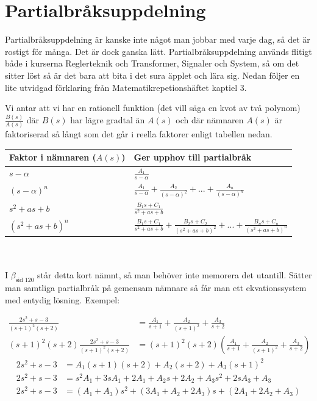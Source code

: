 \documentclass[a4paper]{article}
\newcommand{\mhb}[1]{$\beta_{\text{#1}}$}     %
\begin{document}
\section{Partialbråksuppdelning}
\label{sec:partialbråksuppdelning}
Partialbråksuppdelning är kanske inte något man jobbar med varje dag, så det är rostigt för många. Det är dock ganska lätt. Partialbråksuppdelning används flitigt både i kurserna Reglerteknik och Transformer, Signaler och System, så om det sitter löst så är det bara att bita i det sura äpplet och lära sig. Nedan följer en lite utvidgad förklaring från Matematikrepetionshäftet kaptiel 3.

Vi antar att vi har en rationell funktion (det vill säga en kvot av två polynom) $\frac{B(s)}{A(s)}$ där $B(s)$ har lägre gradtal än $A(s)$ och där nämnaren $A(s)$ är faktoriserad så långt som det går i reella faktorer enligt tabellen nedan.\\

\begin{tabular}{l | l}
  Faktor i nämnaren ($A(s)$) & Ger upphov till partialbråk \\
  \hline
  $s - \alpha$       & $\frac{A_1}{s - \alpha}$ \\
  $(s - \alpha)^n$   & $\frac{A_1}{s - \alpha} + \frac{A_2}{(s - \alpha)^2} + ... + \frac{A_n}{(s - \alpha)^n}$ \\
  $s^2 + as + b$     & $\frac{B_1s + C_1}{s^2 + as + b}$ \\
  $(s^2 + as + b)^n$ & $\frac{B_1s + C_1}{s^2 + as + b} + \frac{B_2s + C_2}{(s^2 + as + b)^2} + ... + \frac{B_ns + C_n}{(s^2 + as + b)^n}$
\end{tabular}\\\\

I \mhb{sid 120} står detta kort nämnt, så man behöver inte memorera det utantill. Sätter man samtliga partialbråk på gemensam nämnare så får man ett ekvationssystem med entydig lösning. Exempel:

\begin{align}
  \frac{2s^2 + s -3}{(s+1)^2(s+2)} &= \frac{A_1}{s+1} + \frac{A_2}{(s+1)^2} + \frac{A_3}{s+2} \label{eqn:partfracA}\\
  (s+1)^2(s+2) \frac{2s^2 + s -3}{(s+1)^2(s+2)} &= (s+1)^2(s+2) \left( \frac{A_1}{s+1} + \frac{A_2}{(s+1)^2} + \frac{A_3}{s+2} \right) \label{eqn:partfracB}
\end{align}
\vspace{-7mm}
\begin{align}
  2s^2 + s -3 &= A_1(s+1)(s+2) + A_2(s+2) + A_3(s+1)^2 \label{eqn:partfracC}\\
  2s^2 + s -3 &= s^2A_1 + 3sA_1 + 2A_1 + A_2s + 2A_2 + A_3s^2 + 2sA_3 + A_3 \label{eqn:partfracD}\\
  2s^2 + s -3 &= (A_1 + A_3)s^2 + (3A_1 + A_2 + 2A_3)s + (2A_1 + 2A_2 + A_3) \label{eqn:partfracE}
\end{align}
\end{document}
